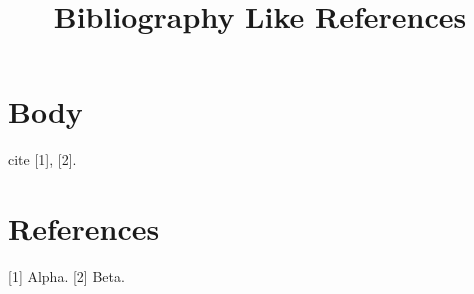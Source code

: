 \documentclass{article}
\begin{document}
\title{Bibliography Like References}\maketitle
\section{Body} cite [1], [2].\section{References}\label{sec:refs} [1] Alpha. [2] Beta.
\end{document}
